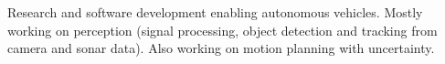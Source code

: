 Research and software development enabling autonomous vehicles. Mostly working on perception (signal processing, object detection and tracking from camera and sonar data). Also working on motion planning with uncertainty.
